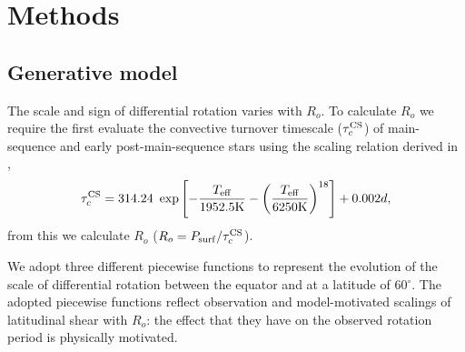 \section{Methods}
\label{sec:methods}

\subsection{Generative model}

The scale and sign of differential rotation varies with $R_o$.
To calculate $R_o$ we require the first evaluate the convective turnover timescale ($\tau_c^{\rm{CS}}$) of main-sequence and early post-main-sequence stars using the scaling relation derived in \citet{cranmer_testing_2011},
\begin{equation}
	\tau_c^{\rm{CS}} = 314.24 \ \exp\left[ -\frac{T_{\rm{eff}}}{1952.5\rm{K}} - \left( \frac{T_{\rm{eff}}}{6250 \rm{K}}\right)^{18}\right] + 0.002 d,
\end{equation}
from this we calculate $R_o$ ($R_o = P_{\rm{surf}}/\tau_c^{\rm{CS}}$).

We adopt three different piecewise functions to represent the evolution of the scale of differential rotation between the equator and at a latitude of 60$^{\circ}$.
The adopted piecewise functions reflect observation \citep{saar_starspots_2011} and model-motivated \citep{brun_powering_2022} scalings of latitudinal shear with $R_o$: the effect that they have on the observed rotation period is physically motivated.

